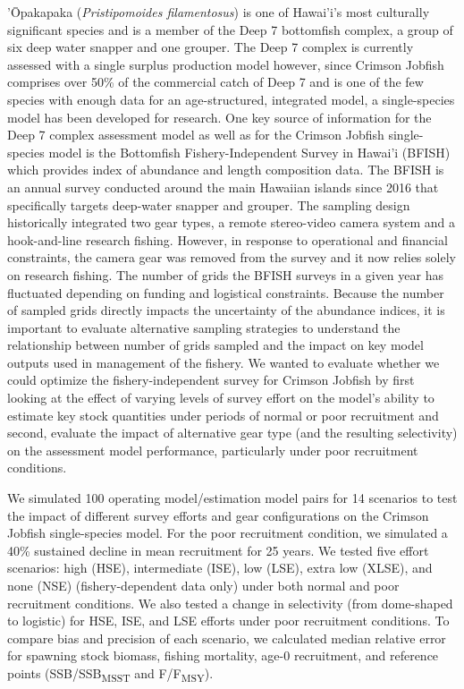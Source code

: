 \documentclass[
  letterpaper,
  12pt,
  letterpaper]{report}
\begin{document}
'Ōpakapaka (\emph{Pristipomoides filamentosus}) is one of Hawai'i's most
culturally significant species and is a member of the Deep 7 bottomfish
complex, a group of six deep water snapper and one grouper. The Deep 7
complex is currently assessed with a single surplus production model
however, since Crimson Jobfish comprises over 50\% of the commercial
catch of Deep 7 and is one of the few species with enough data for an
age-structured, integrated model, a single-species model has been
developed for research. One key source of information for the Deep 7
complex assessment model as well as for the Crimson Jobfish
single-species model is the Bottomfish Fishery-Independent Survey in
Hawai'i (BFISH) which provides index of abundance and length composition
data. The BFISH is an annual survey conducted around the main Hawaiian
islands since 2016 that specifically targets deep-water snapper and
grouper. The sampling design historically integrated two gear types, a
remote stereo-video camera system and a hook-and-line research fishing.
However, in response to operational and financial constraints, the
camera gear was removed from the survey and it now relies solely on
research fishing. The number of grids the BFISH surveys in a given year
has fluctuated depending on funding and logistical constraints. Because
the number of sampled grids directly impacts the uncertainty of the
abundance indices, it is important to evaluate alternative sampling
strategies to understand the relationship between number of grids
sampled and the impact on key model outputs used in management of the
fishery. We wanted to evaluate whether we could optimize the
fishery-independent survey for Crimson Jobfish by first looking at the
effect of varying levels of survey effort on the model's ability to
estimate key stock quantities under periods of normal or poor
recruitment and second, evaluate the impact of alternative gear type
(and the resulting selectivity) on the assessment model performance,
particularly under poor recruitment conditions.

We simulated 100 operating model/estimation model pairs for 14 scenarios
to test the impact of different survey efforts and gear configurations
on the Crimson Jobfish single-species model. For the poor recruitment
condition, we simulated a 40\% sustained decline in mean recruitment for
25 years. We tested five effort scenarios: high (HSE), intermediate
(ISE), low (LSE), extra low (XLSE), and none (NSE) (fishery-dependent
data only) under both normal and poor recruitment conditions. We also
tested a change in selectivity (from dome-shaped to logistic) for HSE,
ISE, and LSE efforts under poor recruitment conditions. To compare bias
and precision of each scenario, we calculated median relative error for
spawning stock biomass, fishing mortality, age-0 recruitment, and
reference points (SSB/SSB\textsubscript{MSST} and
F/F\textsubscript{MSY}).
\end{document}
